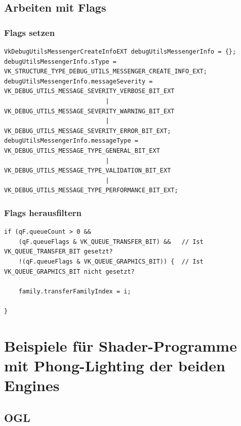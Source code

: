 \documentclass[titlepage, 11pt, a4paper, ngerman]{article}
\begin{document}
\subsection{Arbeiten mit Flags}
\subsubsection{Flags setzen}
\begin{verbatim}
VkDebugUtilsMessengerCreateInfoEXT debugUtilsMessengerInfo = {};
debugUtilsMessengerInfo.sType = VK_STRUCTURE_TYPE_DEBUG_UTILS_MESSENGER_CREATE_INFO_EXT;
debugUtilsMessengerInfo.messageSeverity = VK_DEBUG_UTILS_MESSAGE_SEVERITY_VERBOSE_BIT_EXT
                            | VK_DEBUG_UTILS_MESSAGE_SEVERITY_WARNING_BIT_EXT
                            | VK_DEBUG_UTILS_MESSAGE_SEVERITY_ERROR_BIT_EXT;
debugUtilsMessengerInfo.messageType = VK_DEBUG_UTILS_MESSAGE_TYPE_GENERAL_BIT_EXT
                            | VK_DEBUG_UTILS_MESSAGE_TYPE_VALIDATION_BIT_EXT
                            | VK_DEBUG_UTILS_MESSAGE_TYPE_PERFORMANCE_BIT_EXT;
\end{verbatim}

\subsubsection{Flags herausfiltern}
\begin{verbatim}
if (qF.queueCount > 0 &&
    (qF.queueFlags & VK_QUEUE_TRANSFER_BIT) &&   // Ist VK_QUEUE_TRANSFER_BIT gesetzt?
    !(qF.queueFlags & VK_QUEUE_GRAPHICS_BIT)) {  // Ist VK_QUEUE_GRAPHICS_BIT nicht gesetzt?

    family.transferFamilyIndex = i;

}
\end{verbatim}

\newpage
\section{Beispiele für Shader-Programme mit Phong-Lighting der beiden Engines}
\subsection{OGL}
\end{document}
